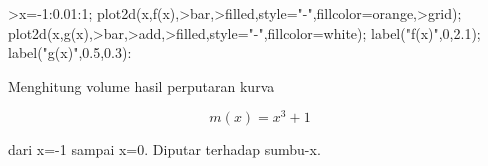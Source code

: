 \documentclass{article}
\begin{document}
\begin{eulernotebook}
\begin{eulercomment}
\begin{eulercomment}
\begin{eulercomment}
\begin{eulercomment}
\begin{eulercomment}
\begin{eulercomment}
\begin{eulerformula}
\[\]
\end{eulerformula}
\begin{eulerprompt}
>x=-1:0.01:1; plot2d(x,f(x),>bar,>filled,style="-",fillcolor=orange,>grid); plot2d(x,g(x),>bar,>add,>filled,style="-",fillcolor=white); label("f(x)",0,2.1); label("g(x)",0.5,0.3):
\end{eulerprompt}
\begin{eulercomment}
\end{eulercomment}
\eulersubheading{}
\begin{eulercomment}
Menghitung volume hasil perputaran kurva\\
\end{eulercomment}
\begin{eulerformula}
\[
m(x)=x^3+1
\]
\end{eulerformula}
\begin{eulercomment}
dari x=-1 sampai x=0. Diputar terhadap sumbu-x.


\end{eulercomment}
\end{eulercomment}
\end{eulercomment}
\end{eulercomment}
\end{eulercomment}
\end{eulercomment}
\end{eulercomment}
\end{eulernotebook}
\end{document}
